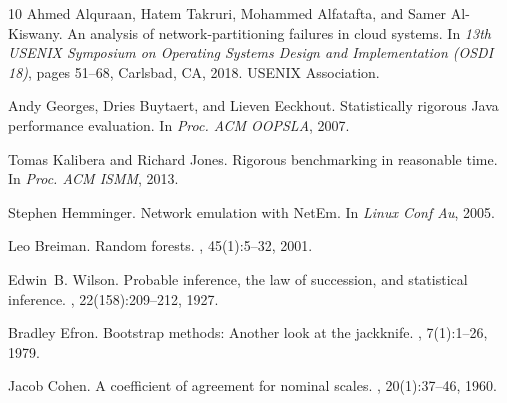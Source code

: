 \documentclass[smallextended]{svjour3}
\begin{document}
\begin{thebibliography}{10}
Ahmed Alquraan, Hatem Takruri, Mohammed Alfatafta, and Samer Al-Kiswany.
\newblock An analysis of network-partitioning failures in cloud systems.
\newblock In {\em 13th USENIX Symposium on Operating Systems Design and
  Implementation (OSDI 18)}, pages 51--68, Carlsbad, CA, 2018. USENIX
  Association.

Andy Georges, Dries Buytaert, and Lieven Eeckhout.
\newblock Statistically rigorous {Java} performance evaluation.
\newblock In {\em Proc. ACM OOPSLA}, 2007.

Tomas Kalibera and Richard Jones.
\newblock Rigorous benchmarking in reasonable time.
\newblock In {\em Proc. ACM ISMM}, 2013.

Stephen Hemminger.
\newblock Network emulation with {NetEm}.
\newblock In {\em Linux Conf Au}, 2005.

Leo Breiman.
\newblock Random forests.
, 45(1):5--32, 2001.

Edwin~B. Wilson.
\newblock Probable inference, the law of succession, and statistical inference.
,
  22(158):209--212, 1927.

Bradley Efron.
\newblock Bootstrap methods: Another look at the jackknife.
, 7(1):1--26, 1979.

Jacob Cohen.
\newblock A coefficient of agreement for nominal scales.
, 20(1):37--46, 1960.

\end{thebibliography}
\end{document}

